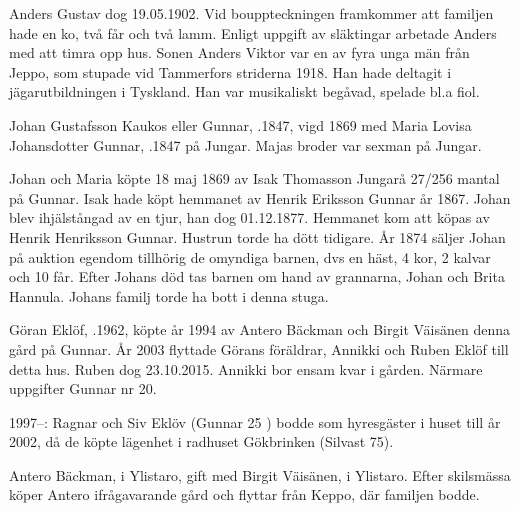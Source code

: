 Anders Gustav dog 19.05.1902. Vid bouppteckningen framkommer att familjen hade en ko, två får och två lamm. Enligt uppgift av släktingar arbetade Anders med att timra opp hus. Sonen Anders Viktor var en av fyra unga män från Jeppo, som stupade vid Tammerfors striderna 1918. Han hade deltagit i jägarutbildningen i Tyskland. Han var musikaliskt begåvad, spelade bl.a fiol.


Johan Gustafsson Kaukos eller Gunnar, .1847, vigd 1869 med Maria Lovisa Johansdotter Gunnar, .1847 på Jungar. Majas broder var sexman på Jungar.
\begin{jhchildren}
  \item {}
  \item {}
  \item {}
\end{jhchildren}

Johan och Maria köpte 18 maj 1869 av Isak Thomasson Jungarå 27/256 mantal på Gunnar. Isak hade köpt hemmanet av Henrik Eriksson Gunnar år 1867. Johan blev ihjälstångad av en tjur, han dog 01.12.1877. Hemmanet kom att köpas av Henrik Henriksson Gunnar. Hustrun torde ha dött tidigare. År 1874 säljer Johan på auktion egendom tillhörig de omyndiga barnen, dvs en häst, 4 kor, 2 kalvar och 10 får. Efter Johans död tas barnen om hand av grannarna, Johan och Brita Hannula. Johans familj torde ha bott i denna stuga.






Göran Eklöf, .1962, köpte år 1994 av Antero Bäckman  och Birgit Väisänen denna gård på Gunnar. År 2003 flyttade Görans föräldrar, Annikki och Ruben Eklöf till detta hus. Ruben dog 23.10.2015. Annikki bor ensam kvar i gården. Närmare uppgifter Gunnar nr 20.

1997--: Ragnar och Siv Eklöv (Gunnar 25 ) bodde som hyresgäster i huset till år 2002, då de köpte lägenhet i radhuset Gökbrinken (Silvast 75).


Antero Bäckman,  i Ylistaro, gift med Birgit Väisänen,  i Ylistaro. Efter skilsmässa köper Antero ifrågavarande gård och flyttar från Keppo, där familjen bodde.
\begin{jhchildren}
  \item {}
  \item {}
\end{jhchildren}


